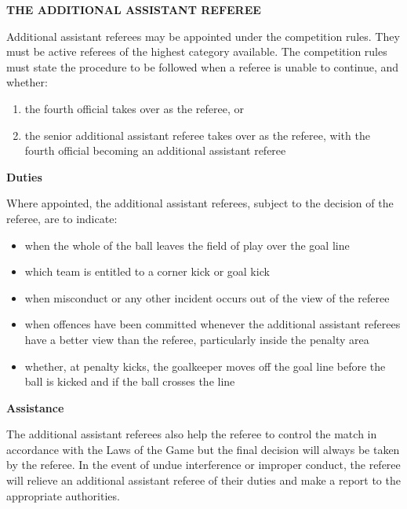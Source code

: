 \clearpage
\sffamily
{\bfseries\color[rgb]{0.4,0.4,0.4}
THE ADDITIONAL ASSISTANT REFEREE}

\bigskip

Additional assistant referees may be appointed under the competition rules. They must be active referees of the highest category available. The competition rules must state the procedure to be followed when a referee is unable to continue, and whether:

\begin{enumerate}
\item the fourth official takes over as the referee, or
\item the senior additional assistant referee takes over as the referee, with the fourth official becoming an additional assistant referee
\end{enumerate}

\bigskip

{\bfseries Duties}

\headlinebox

Where appointed, the additional assistant referees, subject to the decision of the referee, are to indicate:

\begin{itemize}
\item when the whole of the ball leaves the field of play over the goal line
\item which team is entitled to a corner kick or goal kick 
\item when misconduct or any other incident occurs out of the view of the referee
\item when offences have been committed whenever the additional assistant referees have a better view than the referee, particularly inside the penalty area
\item whether, at penalty kicks, the goalkeeper moves off the goal line before the ball is kicked and if the ball crosses the line
\end{itemize}

\bigskip

{\bfseries Assistance}

\headlinebox

The additional assistant referees also help the referee to control the match in accordance with the Laws of the Game but the final decision will always be taken by the referee. In the event of undue interference or improper conduct, the referee will relieve an additional assistant
referee of their duties and make a report to the appropriate authorities.